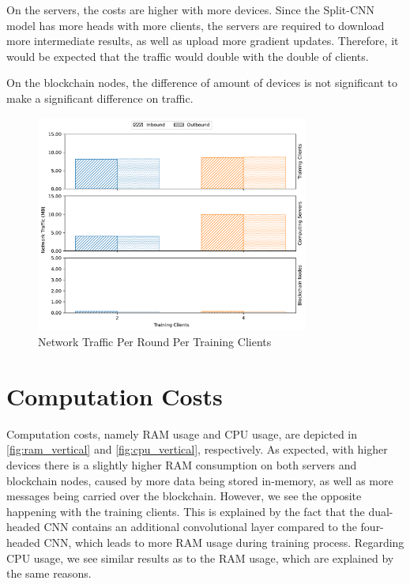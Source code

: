 On the servers, the costs are higher with more devices. Since the Split-CNN model has more heads with more clients, the servers are required to download more intermediate results, as well as upload more gradient updates. Therefore, it would be expected that the traffic would double with the double of clients.

On the blockchain nodes, the difference of amount of devices is not significant to make a significant difference on traffic.

\begin{figure}[!ht]
    \centering
    \centering
    \includegraphics[width=0.8\textwidth]{graphics/vertical/net.pdf}
    \caption{Network Traffic Per Round Per Training Clients}
    \label{fig:net_vertical}
\end{figure}

\section{Computation Costs}

Computation costs, namely RAM usage and CPU usage, are depicted in \autoref{fig:ram_vertical} and \autoref{fig:cpu_vertical}, respectively. As expected, with higher devices there is a slightly higher RAM consumption on both servers and blockchain nodes, caused by more data being stored in-memory, as well as more messages being carried over the blockchain. However, we see the opposite happening with the training clients. This is explained by the fact that the dual-headed CNN contains an additional convolutional layer compared to the four-headed CNN, which leads to more RAM usage during training process. Regarding CPU usage, we see similar results as to the RAM usage, which are explained by the same reasons.

